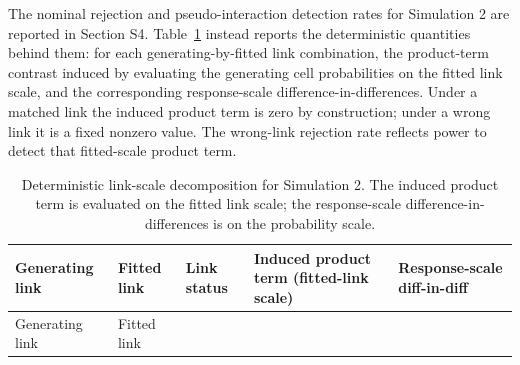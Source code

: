\documentclass[
  man,
  floatsintext,
  longtable,
  nolmodern,
  notxfonts,
  notimes,
  colorlinks=true,linkcolor=blue,citecolor=blue,urlcolor=blue]{apa7}
\begin{document}
The nominal rejection and pseudo-interaction detection rates for
Simulation 2 are reported in Section S4.
Table~\ref{tbl-within-family-deterministic} instead reports the
deterministic quantities behind them: for each generating-by-fitted link
combination, the product-term contrast induced by evaluating the
generating cell probabilities on the fitted link scale, and the
corresponding response-scale difference-in-differences. Under a matched
link the induced product term is zero by construction; under a wrong
link it is a fixed nonzero value. The wrong-link rejection rate reflects
power to detect that fitted-scale product term.

\begin{longtable}[]{@{}
  >{\raggedright\arraybackslash}p{}
  >{\raggedright\arraybackslash}p{}
  >{\raggedright\arraybackslash}p{}
  >{\raggedright\arraybackslash}p{}
  >{\raggedright\arraybackslash}p{}@{}}
\caption{Deterministic link-scale decomposition for Simulation 2. The
induced product term is evaluated on the fitted link scale; the
response-scale difference-in-differences is on the probability
scale.}\label{tbl-within-family-deterministic}\tabularnewline
\toprule\noalign{}
\begin{minipage}[b]{\linewidth}\raggedright
Generating link
\end{minipage} & \begin{minipage}[b]{\linewidth}\raggedright
Fitted link
\end{minipage} & \begin{minipage}[b]{\linewidth}\raggedright
Link status
\end{minipage} & \begin{minipage}[b]{\linewidth}\raggedright
Induced product term (fitted-link scale)
\end{minipage} & \begin{minipage}[b]{\linewidth}\raggedright
Response-scale diff-in-diff
\end{minipage} \\
\midrule\noalign{}
\endfirsthead
\toprule\noalign{}
\begin{minipage}[b]{\linewidth}\raggedright
Generating link
\end{minipage} & \begin{minipage}[b]{\linewidth}\raggedright
Fitted link
\end{minipage} & \begin{minipage}[b]{\linewidth}\raggedright

\end{minipage}
\end{longtable}
\end{document}
